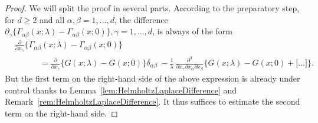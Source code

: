\begin{proof}
  We will split the proof in several parts.
  According to the preparatory step, for $d \geq 2$ and all $\alpha, \beta = 1,\dots,d$, the difference $\partial_\gamma\big\{\Gamma_{\alpha\beta}(x; \lambda) - \Gamma_{\alpha\beta}(x; 0)\big\}, \gamma = 1,\dots,d$, is always of the form
  \begin{align*}
    &\frac{\partial}{\partial x_\gamma}\Big\{\Gamma_{\alpha\beta}(x; \lambda) - \Gamma_{\alpha\beta}(x; 0)\Big\} \\
    &    \qquad\quad= \frac{\partial}{\partial x_\gamma}\Big\{ G(x; \lambda) - G(x; 0) \Big\}\delta_{\alpha\beta} \
        - \frac{1}{\lambda}\, \frac{\partial^3}{\partial x_\gamma \partial x_\alpha \partial x_\beta} \Big\{ G(x; \lambda) - G(x; 0) + \big[ \dots \big] \Big\}.
  \end{align*}
  But the first term on the right-hand side of the above expression is already under control thanks to Lemma~\ref{lem:HelmholtzLaplaceDifference} and Remark~\ref{rem:HelmholtzLaplaceDifference}.
  It thus suffices to estimate the second term on the right-hand side.


\end{proof}
